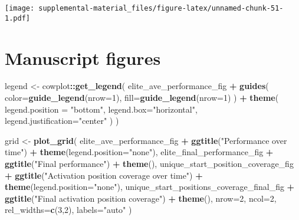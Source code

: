 \documentclass[]{book}
\newenvironment{Shaded}{\begin{snugshade}}{\end{snugshade}}
\newcommand{\DataTypeTok}[1]{\textcolor[rgb]{0.13,0.29,0.53}{#1}}
\newcommand{\DecValTok}[1]{\textcolor[rgb]{0.00,0.00,0.81}{#1}}
\newcommand{\KeywordTok}[1]{\textcolor[rgb]{0.13,0.29,0.53}{\textbf{#1}}}
\newcommand{\NormalTok}[1]{#1}
\newcommand{\OperatorTok}[1]{\textcolor[rgb]{0.81,0.36,0.00}{\textbf{#1}}}
\newcommand{\StringTok}[1]{\textcolor[rgb]{0.31,0.60,0.02}{#1}}
\begin{document}
\texttt{[image: supplemental-material\_files/figure-latex/unnamed-chunk-51-1.pdf]}

\hypertarget{manuscript-figures-4}{%
\section{Manuscript figures}\label{manuscript-figures-4}}

\begin{Shaded}
\begin{Highlighting}[]
\NormalTok{legend <-}\StringTok{ }\NormalTok{cowplot}\OperatorTok{::}\KeywordTok{get_legend}\NormalTok{(}
\NormalTok{    elite_ave_performance_fig }\OperatorTok{+}
\StringTok{      }\KeywordTok{guides}\NormalTok{(}
        \DataTypeTok{color=}\KeywordTok{guide_legend}\NormalTok{(}\DataTypeTok{nrow=}\DecValTok{1}\NormalTok{),}
        \DataTypeTok{fill=}\KeywordTok{guide_legend}\NormalTok{(}\DataTypeTok{nrow=}\DecValTok{1}\NormalTok{)}
\NormalTok{      ) }\OperatorTok{+}
\StringTok{      }\KeywordTok{theme}\NormalTok{(}
        \DataTypeTok{legend.position =} \StringTok{"bottom"}\NormalTok{,}
        \DataTypeTok{legend.box=}\StringTok{"horizontal"}\NormalTok{,}
        \DataTypeTok{legend.justification=}\StringTok{"center"}
\NormalTok{      )}
\NormalTok{  )}

\NormalTok{grid <-}\StringTok{ }\KeywordTok{plot_grid}\NormalTok{(}
\NormalTok{  elite_ave_performance_fig }\OperatorTok{+}
\StringTok{    }\KeywordTok{ggtitle}\NormalTok{(}\StringTok{"Performance over time"}\NormalTok{) }\OperatorTok{+}
\StringTok{    }\KeywordTok{theme}\NormalTok{(}\DataTypeTok{legend.position=}\StringTok{"none"}\NormalTok{),}
\NormalTok{  elite_final_performance_fig }\OperatorTok{+}
\StringTok{    }\KeywordTok{ggtitle}\NormalTok{(}\StringTok{"Final performance"}\NormalTok{) }\OperatorTok{+}
\StringTok{    }\KeywordTok{theme}\NormalTok{(),}
\NormalTok{  unique_start_position_coverage_fig }\OperatorTok{+}
\StringTok{    }\KeywordTok{ggtitle}\NormalTok{(}\StringTok{"Activation position coverage over time"}\NormalTok{) }\OperatorTok{+}
\StringTok{    }\KeywordTok{theme}\NormalTok{(}\DataTypeTok{legend.position=}\StringTok{"none"}\NormalTok{),}
\NormalTok{  unique_start_positions_coverage_final_fig }\OperatorTok{+}
\StringTok{    }\KeywordTok{ggtitle}\NormalTok{(}\StringTok{"Final activation position coverage"}\NormalTok{) }\OperatorTok{+}
\StringTok{    }\KeywordTok{theme}\NormalTok{(),}
  \DataTypeTok{nrow=}\DecValTok{2}\NormalTok{,}
  \DataTypeTok{ncol=}\DecValTok{2}\NormalTok{,}
  \DataTypeTok{rel_widths=}\KeywordTok{c}\NormalTok{(}\DecValTok{3}\NormalTok{,}\DecValTok{2}\NormalTok{),}
  \DataTypeTok{labels=}\StringTok{"auto"}
\NormalTok{)}


\end{Highlighting}
\end{Shaded}
\end{document}
